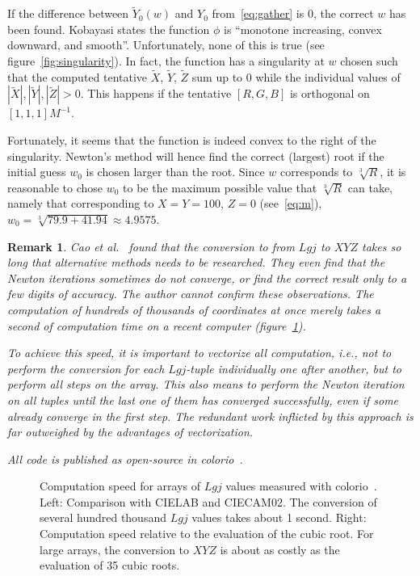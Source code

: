 \documentclass{scrartcl}
\newtheorem*{remark}{Remark}
\theoremstyle{named}
\begin{document}
If the difference between $\tilde{Y}_0(w)$ and $Y_0$ from~\eqref{eq:gather} is 0, the
correct $w$ has been found.  Kobayasi states the function $\phi$ is ``monotone
increasing, convex downward, and smooth''. Unfortunately, none of this is true (see
figure~\ref{fig:singularity}). In fact, the function has a singularity at $w$ chosen
such that the computed tentative $\tilde{X}$, $\tilde{Y}$, $\tilde{Z}$ sum up to 0 while
the individual values of $|\tilde{X}|, |\tilde{Y}|, |\tilde{Z}| > 0$. This happens if
the tentative $[R, G, B]$ is orthogonal on $[1,1,1] M^{-1}$.

Fortunately, it seems that the function is indeed convex to the right of the
singularity.  Newton's method will hence find the correct (largest) root if the initial
guess $w_0$ is chosen larger than the root. Since $w$ corresponds to $\sqrt[3]{R}$, it
is reasonable to chose $w_0$ to be the maximum possible value that $\sqrt[3]{R}$ can
take, namely that corresponding to $X=Y=100$, $Z=0$ (see~\eqref{eq:m}), $w_0=\sqrt[3]{79.9
+ 41.94}\approx 4.9575$.

\begin{remark}
  Cao et al.~\cite{cao} found that the conversion to from $Lgj$ to $XYZ$ takes so long
  that alternative methods needs to be researched. They even find that the Newton
  iterations sometimes do not converge, or find the correct result only to a few digits
  of accuracy.  The author cannot confirm these observations. The computation of
  hundreds of thousands of coordinates at once merely takes a second of computation time
  on a recent computer (figure~\ref{fig:speed}).

  To achieve this speed, it is important to vectorize all computation, i.e., not to
  perform the conversion for each $Lgj$-tuple individually one after another, but to
  perform all steps on the array. This also means to perform the Newton iteration on all
  tuples until the last one of them has converged successfully, even if some already
  converge in the first step. The redundant work inflicted by this approach is far
  outweighed by the advantages of vectorization.

  All code is published as open-source in colorio~\cite{colorio}.
\end{remark}

\begin{figure}
  \centering
  \hfill
  
  \hfill
  
  \hfill
  \caption{Computation speed for arrays of $Lgj$ values measured with
  colorio~\cite{colorio}. Left: Comparison with CIELAB and CIECAM02.
  The conversion of several hundred thousand $Lgj$ values takes about 1 second. Right:
  Computation speed relative to the evaluation of the cubic root. For large arrays, the
  conversion to $XYZ$ is about as costly as the evaluation of 35 cubic roots.}\label{fig:speed}
\end{figure}

{}

\end{document}
